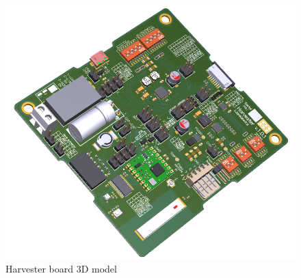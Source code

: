 \documentclass[12pt,a4paper]{article}
\begin{document}
\begin{figure}[ht!]
\includegraphics[scale=0.75]{harvester2.png}
\caption{Harvester board 3D model}
\label{fig:harvester3d}
\end{figure}



\clearpage

\printbibliography

% 
%
\end{document}
